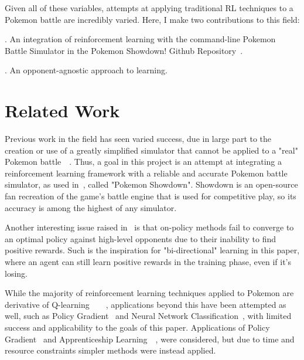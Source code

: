 \documentclass{article}
\begin{document}
\quad	Given all of these variables, attempts at applying traditional RL techniques to a Pokemon battle are incredibly varied. Here, I make two contributions to this field:

. An integration of reinforcement learning with the command-line Pokemon Battle Simulator in the Pokemon Showdown! Github Repository~\citep{Showdown}.

. An opponent-agnostic approach to learning.


\section{Related Work}
\label{sec:related_work}

\quad	Previous work in the field has seen varied success, due in large part to the creation or use of a greatly simplified simulator that cannot be applied to a "real" Pokemon battle~\citep{CalebLewis}~\citep{Akshay}. Thus, a goal in this project is an attempt at integrating a reinforcement learning framework with a reliable and accurate Pokemon battle simulator, as used in~\citet{KevinChen}, called "Pokemon Showdown". Showdown is an open-source fan recreation of the game's battle engine that is used for competitive play, so its accuracy is among the highest of any simulator.

\quad Another interesting issue raised in~\citet{KevinChen} is that on-policy methods fail to converge to an optimal policy against high-level opponents due to their inability to find positive rewards. Such is the inspiration for "bi-directional" learning in this paper, where an agent can still learn positive rewards in the training phase, even if it's losing.

\quad While the majority of reinforcement learning techniques applied to Pokemon are derivative of Q-learning~\citep{CalebLewis}~\citep{Akshay}~\citep{KevinChen}~\citep{RodrigoRill}, applications beyond this have been attempted as well, such as Policy Gradient~\citep{JosephFlaherty} and Neural Network Classification~\citep{RodrigoRill2}, with limited success and applicability to the goals of this paper. Applications of Policy Gradient~\citep{Sutton} and Apprenticeship Learning~\citep{Pieter}~\citep{MyProf}, were considered, but due to time and resource constraints simpler methods were instead applied. 

\end{document}
